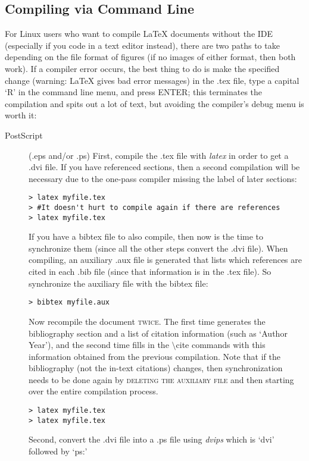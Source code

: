 \documentclass[10pt]{article}
\begin{document}
\subsection{Compiling via Command Line\label{howRickCompiles}}
For Linux users who want to compile LaTeX documents without the IDE (especially if you code in a text editor instead), there are two paths to take depending on the file format of figures (if no images of either format, then both work).  If a compiler error occurs, the best thing to do is make the specified change (warning: LaTeX gives bad error messages) in the .tex file, type a capital `R' in the command line menu, and press ENTER; this terminates the compilation and spits out a lot of text, but avoiding the compiler's debug menu is worth it:
\begin{description}
\item[PostScript] (.eps and/or .ps) First, compile the .tex file with \textit{latex} in order to get a .dvi file.  If you have referenced sections, then a second compilation will be necessary due to the one-pass compiler missing the label of later sections:
\begin{verbatim}
> latex myfile.tex
> #It doesn't hurt to compile again if there are references
> latex myfile.tex
\end{verbatim}
If you have a bibtex file to also compile, then now is the time to synchronize them (since all the other steps convert the .dvi file).  When compiling, an auxiliary .aux file is generated that lists which references are cited in each .bib file (since that information is in the .tex file).  So synchronize the auxiliary file with the bibtex file:
\begin{verbatim}
> bibtex myfile.aux
\end{verbatim}
Now recompile the document \textsc{twice}.  The first time generates the bibliography section and a list of citation information (such as `Author Year'), and the second time fills in the $ \setminus $cite commands with this information obtained from the previous compilation.  Note that if the bibliography (not the in-text citations) changes, then synchronization needs to be done again by \textsc{deleting the auxiliary file} and then starting over the entire compilation process.
\begin{verbatim}
> latex myfile.tex
> latex myfile.tex
\end{verbatim}
Second, convert the .dvi file into a .ps file using \textit{dvips} which is `dvi' followed by `ps:'
\begin{verbatim}

\end{verbatim}
\end{description}
\end{document}
